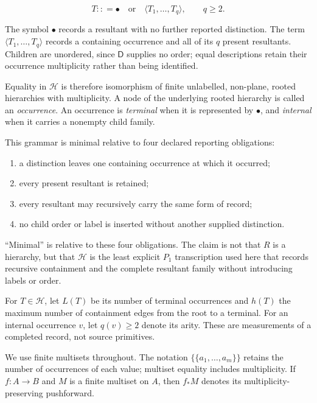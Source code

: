 \documentclass[11pt,a4paper]{article}
\begin{document}
\[T:: = \bullet \quad\text{or}\quad\langle T_{1},\ldots,T_{q}\rangle,\quad\quad q \geq 2.\]

The symbol \(\bullet\) records a resultant with no further reported
distinction. The term \(\langle T_{1},\ldots,T_{q}\rangle\) records a
containing occurrence and all of its \(q\) present resultants. Children
are unordered, since \(\mathsf{D}\) supplies no order; equal
descriptions retain their occurrence multiplicity rather than being
identified.

Equality in \(\mathcal{H}\) is therefore isomorphism of finite
unlabelled, non-plane, rooted hierarchies with multiplicity. A node of
the underlying rooted hierarchy is called an \emph{occurrence}. An
occurrence is \emph{terminal} when it is represented by \(\bullet\), and
\emph{internal} when it carries a nonempty child family.

This grammar is minimal relative to four declared reporting obligations:

\begin{enumerate}
\def\labelenumi{\arabic{enumi}.}
\tightlist
\item
  a distinction leaves one containing occurrence at which it occurred;
\item
  every present resultant is retained;
\item
  every resultant may recursively carry the same form of record;
\item
  no child order or label is inserted without another supplied
  distinction.
\end{enumerate}

``Minimal'' is relative to these four obligations. The claim is not that
\(R\) is a hierarchy, but that \(\mathcal{H}\) is the least explicit
\(P_{1}\) transcription used here that records recursive containment and
the complete resultant family without introducing labels or order.

For \(T \in \mathcal{H}\), let \(L(T)\) be its number of terminal
occurrences and \(h(T)\) the maximum number of containment edges from
the root to a terminal. For an internal occurrence \(v\), let
\(q(v) \geq 2\) denote its arity. These are measurements of a completed
record, not source primitives.

We use finite multisets throughout. The notation
\(\{\{ a_{1},\ldots,a_{m}\}\}\) retains the number of occurrences of
each value; multiset equality includes multiplicity. If
\(f:A \rightarrow B\) and \(M\) is a finite multiset on \(A\), then
\(f_{*}M\) denotes its multiplicity-preserving pushforward.
\end{document}
